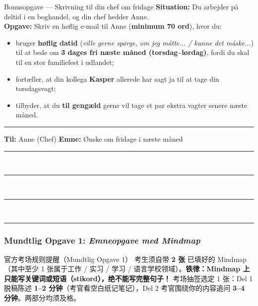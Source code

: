 \begin{emailbox}{Bonusopgave --- Skrivning til din chef om fridage}
\textbf{Situation:} Du arbejder på deltid i en boghandel, og din chef hedder Anne.\\
\textbf{Opgave:} Skriv en høflig e-mail til Anne (\textbf{minimum 70 ord}), hvor du:
\begin{itemize}[itemsep=0.12em, topsep=0.15em]
  \item bruger \textbf{høflig datid} (\textit{ville gerne spørge, om jeg måtte... / kunne det måske...}) til at bede om \textbf{3 dages fri næste måned (torsdag--lørdag)}, fordi du skal til en stor familiefest i udlandet;
  \item fortæller, at din kollega \textbf{Kasper} allerede har sagt ja til at tage din torsdagsvagt;
  \item tilbyder, at du \textbf{til gengæld} gerne vil tage et par ekstra vagter senere næste måned.
\end{itemize}

\vspace{0.25em}
\hrule
\vspace{0.25em}
\textbf{Til:} Anne (Chef) \qquad \textbf{Emne:} Ønske om fridage i næste måned\\[2pt]
\rule{\linewidth}{0.4pt}\\[4pt]
\rule{\linewidth}{0.4pt}\\[4pt]
\rule{\linewidth}{0.4pt}\\[4pt]
\rule{\linewidth}{0.4pt}
\end{emailbox}

\clearpage
{}

\subsubsection*{Mundtlig Opgave 1: \textit{Emneopgave med Mindmap}}

\begin{tipbox}{官方考场规则提醒（Mundtlig Opgave 1）}
考生须自带 \textbf{2 张} 已填好的 Mindmap（其中至少 1 张属于工作 / 实习 / 学习 / 语言学校领域）。\textbf{铁律：Mindmap 上只能写关键词或短语（stikord），绝不能写完整句子！} 考场抽签选定 1 张：Del 1 脱稿陈述 \textbf{1--2 分钟}（考官看空白纸记笔记），Del 2 考官围绕你的内容追问 \textbf{3--4 分钟}。两部分均须及格。
\end{tipbox}


